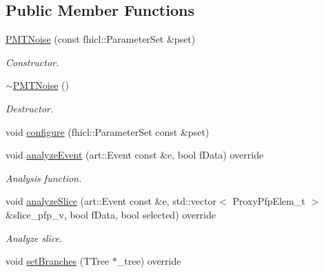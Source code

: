 \subsection*{Public Member Functions}
\begin{DoxyCompactItemize}
\item 
\hyperlink{classanalysis_1_1PMTNoise_a68d40e2ae135ebc8d8dbe3f756ee1850}{P\+M\+T\+Noise} (const fhicl\+::\+Parameter\+Set \&pset)
\begin{DoxyCompactList}\small\item\em Constructor. \end{DoxyCompactList}\item 
\hyperlink{classanalysis_1_1PMTNoise_a10c11f2bd8fd9a55ff8cb816ae23bf33}{$\sim$\+P\+M\+T\+Noise} ()\hypertarget{classanalysis_1_1PMTNoise_a10c11f2bd8fd9a55ff8cb816ae23bf33}{}\label{classanalysis_1_1PMTNoise_a10c11f2bd8fd9a55ff8cb816ae23bf33}

\begin{DoxyCompactList}\small\item\em Destructor. \end{DoxyCompactList}\item 
void \hyperlink{classanalysis_1_1PMTNoise_ac68d1b71ec42d1a6baf987d867775fd1}{configure} (fhicl\+::\+Parameter\+Set const \&pset)
\item 
void \hyperlink{classanalysis_1_1PMTNoise_a939447b8cffa89d11d7f7bc3c99378a6}{analyze\+Event} (art\+::\+Event const \&e, bool f\+Data) override
\begin{DoxyCompactList}\small\item\em Analysis function. \end{DoxyCompactList}\item 
void \hyperlink{classanalysis_1_1PMTNoise_a4c427fe82fe00639048c4a04e29155c8}{analyze\+Slice} (art\+::\+Event const \&e, std\+::vector$<$ Proxy\+Pfp\+Elem\+\_\+t $>$ \&slice\+\_\+pfp\+\_\+v, bool f\+Data, bool selected) override\hypertarget{classanalysis_1_1PMTNoise_a4c427fe82fe00639048c4a04e29155c8}{}\label{classanalysis_1_1PMTNoise_a4c427fe82fe00639048c4a04e29155c8}

\begin{DoxyCompactList}\small\item\em Analyze slice. \end{DoxyCompactList}\item 
void \hyperlink{classanalysis_1_1PMTNoise_acece0a0e60bb9484a1da303cdeb25356}{set\+Branches} (T\+Tree $\ast$\+\_\+tree) override\hypertarget{classanalysis_1_1PMTNoise_acece0a0e60bb9484a1da303cdeb25356}{}\label{classanalysis_1_1PMTNoise_acece0a0e60bb9484a1da303cdeb25356}


\end{DoxyCompactItemize}
